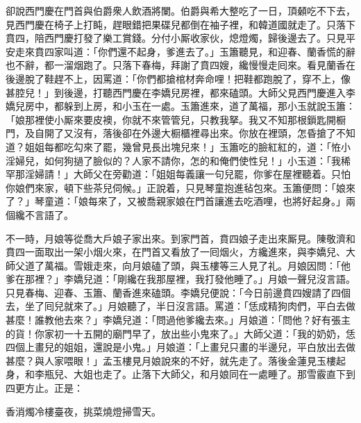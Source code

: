 卻說西門慶在門首與伯爵衆人飲酒將闌。伯爵與希大整吃了一日，頂顙吃不下去，見西門慶在椅子上打盹，趕眼錯把果碟兒都倒在袖子裡，{}和韓道國就走了。只落下賁四，陪西門慶打發了樂工賞錢。分付小厮收家伙，熄燈燭，歸後邊去了。只見平安走來賁四家叫道：「你們還不起身，爹進去了。」玉簫聽見，和迎春、蘭香慌的辭也不辭，都一溜烟跑了。只落下春梅，拜謝了賁四嫂，纔慢慢走囘來。{}看見蘭香在後邊脫了鞋趕不上，因罵道：「你們都搶棺材奔命哩！把鞋都跑脫了，穿不上，像甚腔兒！」到後邊，打聽西門慶在李嬌兒房裡，都來磕頭。大師父見西門慶進入李嬌兒房中，都躲到上房，和小玉在一處。玉簫進來，道了萬福，那小玉就說玉簫：「娘那裡使小厮來要皮襖，你就不來管管兒，只教我拏。我又不知那根鎻匙開橱門，及自開了又沒有，落後卻在外邊大橱櫃裡尋出來。你放在裡頭，怎昏搶了不知道？姐姐每都吃勾來了罷，幾曾見長出塊兒來！」玉簫吃的臉紅紅的，道：「恠小淫婦兒，如何狗撾了臉似的？人家不請你，怎的和俺們使性兒！」小玉道：「我稀罕那淫婦請！」{}大師父在旁勸道：「姐姐每義讓一句兒罷，你爹在屋裡聽着。只怕你娘們來家，頓下些茶兒伺候。」正說着，只見琴童抱進毡包來。玉簫便問：「娘來了？」琴童道：「娘每來了，又被喬親家娘在門首讓進去吃酒哩，也將好起身。」兩個纔不言語了。

不一時，月娘等從喬大戶娘子家出來。到家門首，賁四娘子走出來厮見。陳敬濟和賁四一面取出一架小烟火來，在門首又看放了一囘烟火，方纔進來，與李嬌兒、大師父道了萬福。雪娥走來，向月娘磕了頭，與玉樓等三人見了礼。月娘因問：「他爹在那裡？」李嬌兒道：「剛纔在我那屋裡，我打發他睡了。」月娘一聲兒沒言語。只見春梅、迎春、玉簫、蘭香進來磕頭。李嬌兒便說：「今日前邊賁四嫂請了四個去，坐了囘兒就來了。」月娘聽了，半日沒言語。罵道：「恁成精狗肉們，平白去做甚麼！誰教他去來？」李嬌兒道：「問過他爹纔去來。」月娘道：「問他？好有張主的貨！你家初一十五開的廟門早了，放出些小鬼來了。」大師父道：「我的奶奶，恁四個上畫兒的姐姐，還說是小鬼。」月娘道：「上畫兒只畫的半邊兒，平白放出去做甚麼？與人家喂眼！」孟玉樓見月娘說來的不好，就先走了。落後金蓮見玉樓起身，和李瓶兒、大姐也走了。止落下大師父，和月娘同在一處睡了。那雪霰直下到四更方止。正是：

\begin{myquote}
香消燭冷樓臺夜，挑菜燒燈掃雪天。
\end{myquote}

